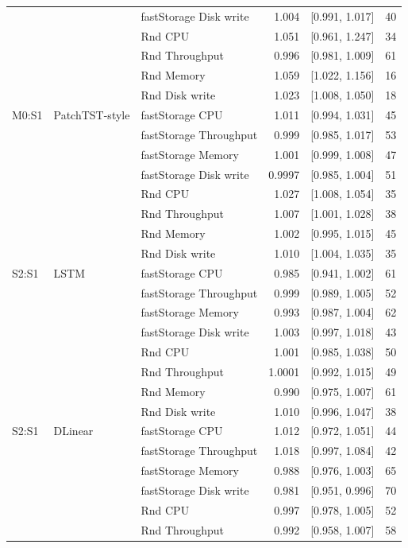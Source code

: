 \documentclass[a4paper,11pt]{article}
\begin{document}
\begin{longtable}{@{}lllrrr@{}}
 &  & fastStorage Disk write & 1.004 & [0.991, 1.017] & 40 \\
 &  & Rnd CPU & 1.051 & [0.961, 1.247] & 34 \\
 &  & Rnd Throughput & 0.996 & [0.981, 1.009] & 61 \\
 &  & Rnd Memory & 1.059 & [1.022, 1.156] & 16 \\
 &  & Rnd Disk write & 1.023 & [1.008, 1.050] & 18 \\
\addlinespace
M0:S1 & PatchTST-style & fastStorage CPU & 1.011 & [0.994, 1.031] & 45 \\
 &  & fastStorage Throughput & 0.999 & [0.985, 1.017] & 53 \\
 &  & fastStorage Memory & 1.001 & [0.999, 1.008] & 47 \\
 &  & fastStorage Disk write & 0.9997 & [0.985, 1.004] & 51 \\
 &  & Rnd CPU & 1.027 & [1.008, 1.054] & 35 \\
 &  & Rnd Throughput & 1.007 & [1.001, 1.028] & 38 \\
 &  & Rnd Memory & 1.002 & [0.995, 1.015] & 45 \\
 &  & Rnd Disk write & 1.010 & [1.004, 1.035] & 35 \\
\addlinespace
S2:S1 & LSTM & fastStorage CPU & 0.985 & [0.941, 1.002] & 61 \\
 &  & fastStorage Throughput & 0.999 & [0.989, 1.005] & 52 \\
 &  & fastStorage Memory & 0.993 & [0.987, 1.004] & 62 \\
 &  & fastStorage Disk write & 1.003 & [0.997, 1.018] & 43 \\
 &  & Rnd CPU & 1.001 & [0.985, 1.038] & 50 \\
 &  & Rnd Throughput & 1.0001 & [0.992, 1.015] & 49 \\
 &  & Rnd Memory & 0.990 & [0.975, 1.007] & 61 \\
 &  & Rnd Disk write & 1.010 & [0.996, 1.047] & 38 \\
\addlinespace
S2:S1 & DLinear & fastStorage CPU & 1.012 & [0.972, 1.051] & 44 \\
 &  & fastStorage Throughput & 1.018 & [0.997, 1.084] & 42 \\
 &  & fastStorage Memory & 0.988 & [0.976, 1.003] & 65 \\
 &  & fastStorage Disk write & 0.981 & [0.951, 0.996] & 70 \\
 &  & Rnd CPU & 0.997 & [0.978, 1.005] & 52 \\
 &  & Rnd Throughput & 0.992 & [0.958, 1.007] & 58 \\

\end{longtable}
\end{document}
